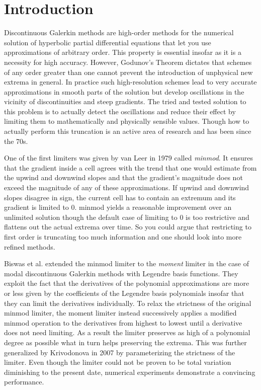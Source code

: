 \section{Introduction}

Discontinuous Galerkin methods are high-order methods for the numerical solution of hyperbolic partial differential equations that let you use approximations of arbitrary order.
This property is essential insofar as it is a necessity for high accuracy.
However, Godunov's Theorem dictates that schemes of any order greater than one cannot prevent the introduction of unphysical new extrema in general.
In practice such high-resolution schemes lead to very accurate approximations in smooth parts of the solution but develop oscillations in the vicinity of discontinuities and steep gradients.
The tried and tested solution to this problem is to actually detect the oscillations and reduce their effect by limiting them to mathematically and physically sensible values.
Though how to actually perform this truncation is an active area of research and has been since the 70s.

One of the first limiters was given by van Leer in 1979 called \emph{minmod}\cite{VanLeer1979}.
It ensures that the gradient inside a cell agrees with the trend that one would estimate from the upwind and downwind slopes and that the gradient's magnitude does not exceed the magnitude of any of these approximations.
If upwind and downwind slopes disagree in sign, the current cell has to contain an extremum and its gradient is limited to $0$.
minmod yields a reasonable improvement over an unlimited solution though the default case of limiting to $0$ is too restrictive and flattens out the actual extrema over time.
So you could argue that restricting to first order is truncating too much information and one should look into more refined methods.

Biswas et al. extended the minmod limiter to the \emph{moment} limiter\cite{Biswas1994} in the case of modal discontinuous Galerkin methods with Legendre basis functions.
They exploit the fact that the derivatives of the polynomial approximations are more or less given by the coefficients of the Legendre basis polynomials insofar that they can limit the derivatives individually.
To relax the strictness of the original minmod limiter, the moment limiter instead successively applies a modified minmod operation to the derivatives from highest to lowest until a derivative does not need limiting.
As a result the limiter preserves as high of a polynomial degree as possible what in turn helps preserving the extrema.
This was further generalized by Krivodonova in 2007 by parameterizing the strictness of the limiter\cite{Krivodonova}.
Even though the limiter could not be proven to be total variation diminishing to the present date, numerical experiments demonstrate a convincing performance.

